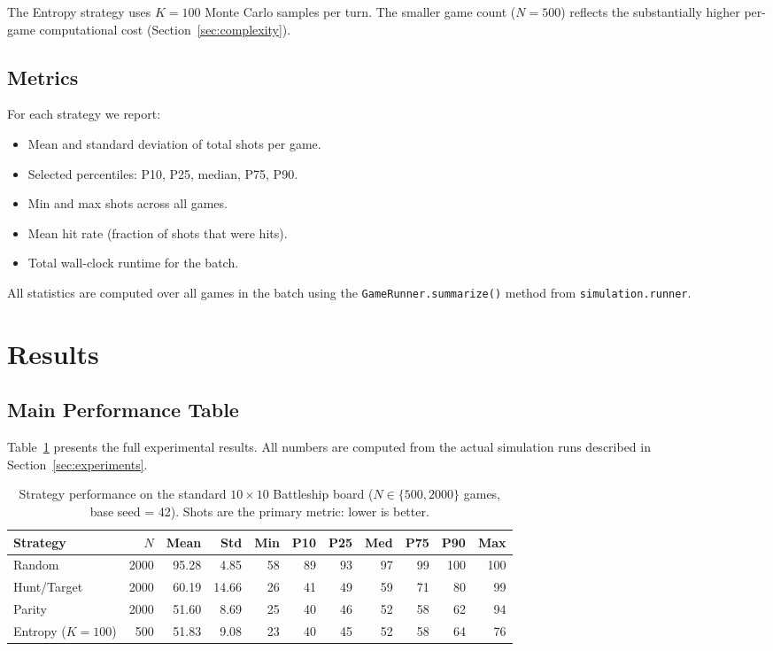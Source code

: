 \documentclass[12pt,a4paper]{article}
\newcommand{\1}{\mathbf{1}}
\begin{document}
\noindent The Entropy strategy uses $K = 100$ Monte Carlo samples per turn.
The smaller game count ($N = 500$) reflects the substantially higher per-game
computational cost (Section~\ref{sec:complexity}).

\subsection{Metrics}

For each strategy we report:
\begin{itemize}[nosep]
  \item Mean and standard deviation of total shots per game.
  \item Selected percentiles: P10, P25, median, P75, P90.
  \item Min and max shots across all games.
  \item Mean hit rate (fraction of shots that were hits).
  \item Total wall-clock runtime for the batch.
\end{itemize}

All statistics are computed over all games in the batch using the
\texttt{GameRunner.summarize()} method from \texttt{simulation.runner}.

\section{Results}
\label{sec:results}

\subsection{Main Performance Table}

Table~\ref{tab:results} presents the full experimental results.  All numbers
are computed from the actual simulation runs described in
Section~\ref{sec:experiments}.

\begin{table}[H]
  \centering
  \caption{Strategy performance on the standard $10 \times 10$ Battleship board
           ($N \in \{500, 2000\}$ games, base seed = 42).  Shots are the primary
           metric: lower is better.}
  \label{tab:results}
  \begin{tabular}{lrrrrrrrrrr}
    \toprule
    Strategy
      & $N$   & Mean  & Std   & Min & P10 & P25 & Med & P75 & P90 & Max \\
    \midrule
    Random
      & 2000  & 95.28 & 4.85  & 58  & 89  & 93  & 97  & 99  & 100 & 100 \\
    Hunt/Target
      & 2000  & 60.19 & 14.66 & 26  & 41  & 49  & 59  & 71  & 80  & 99 \\
    Parity
      & 2000  & 51.60 & 8.69  & 25  & 40  & 46  & 52  & 58  & 62  & 94 \\
    Entropy ($K=100$)
      & 500   & 51.83 & 9.08  & 23  & 40  & 45  & 52  & 58  & 64  & 76 \\
    \bottomrule
  \end{tabular}
\end{table}
\end{document}
